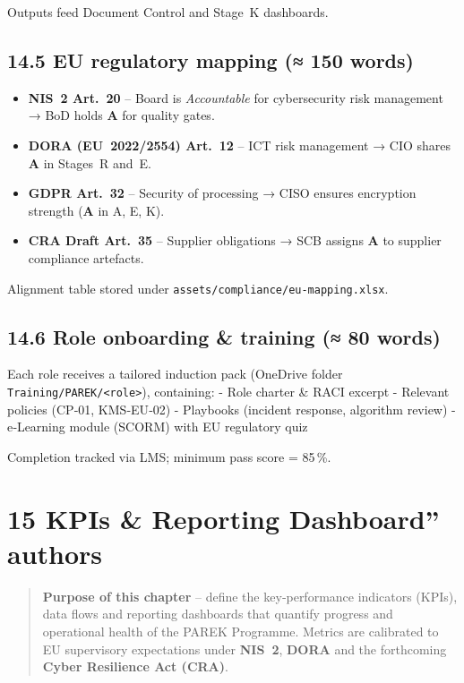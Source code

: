 \documentclass[
  english,
]{article}
\providecommand{\tightlist}{%
  \setlength{\itemsep}{0pt}\setlength{\parskip}{0pt}}
\begin{document}
Outputs feed Document Control and Stage~K dashboards.

\subsection{14.5 EU regulatory mapping (≈ 150
words)}\label{eu-regulatory-mapping-150-words}

\begin{itemize}
\tightlist
\item
  \textbf{NIS~2 Art.~20} -- Board is \emph{Accountable} for
  cybersecurity risk management → BoD holds \textbf{A} for quality
  gates.
\item
  \textbf{DORA (EU~2022/2554) Art.~12} -- ICT risk management → CIO
  shares \textbf{A} in Stages~R and~E.
\item
  \textbf{GDPR Art.~32} -- Security of processing → CISO ensures
  encryption strength (\textbf{A} in A, E, K).
\item
  \textbf{CRA Draft Art.~35} -- Supplier obligations → SCB assigns
  \textbf{A} to supplier compliance artefacts.
\end{itemize}

Alignment table stored under \texttt{assets/compliance/eu‑mapping.xlsx}.

\subsection{14.6 Role onboarding \& training (≈ 80
words)}\label{role-onboarding-training-80-words}

Each role receives a tailored induction pack (OneDrive folder
\texttt{Training/PAREK/\textless{}role\textgreater{}}), containing: -
Role charter \& RACI excerpt - Relevant policies (CP‑01, KMS‑EU‑02) -
Playbooks (incident response, algorithm review) - e‑Learning module
(SCORM) with EU regulatory quiz

Completion tracked via LMS; minimum pass score = 85\,\%.

\section{15 KPIs \& Reporting Dashboard''
authors}\label{kpis-reporting-dashboard-authors}

\begin{quote}
\textbf{Purpose of this chapter} -- define the key‑performance
indicators (KPIs), data flows and reporting dashboards that quantify
progress and operational health of the PAREK Programme. Metrics are
calibrated to EU supervisory expectations under \textbf{NIS~2},
\textbf{DORA} and the forthcoming \textbf{Cyber Resilience Act (CRA)}.
\end{quote}
\end{document}
